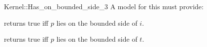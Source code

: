 \begin{ccRefFunctionObjectConcept}{Kernel::Has_on_bounded_side_3}
A model for this must provide:


{returns true iff $p$ lies on the bounded side of $i$.}

{returns true iff $p$ lies on the bounded side of $t$.}

\end{ccRefFunctionObjectConcept}

